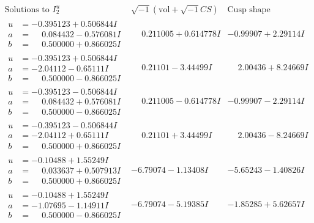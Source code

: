 \documentclass[1p]{elsarticle_modified}
\theoremstyle{definition}
\newcommand{\I}{\sqrt{-1}}
\begin{document}
$$\begin{array}{c|c|c}  
\text{Solutions to }I^u_{2}& \I (\text{vol} + \sqrt{-1}CS) & \text{Cusp shape}\\
 \hline 
\begin{aligned}
u &= -0.395123 + 0.506844 I \\
a &= \phantom{-}0.084432 - 0.576081 I \\
b &= \phantom{-}0.500000 + 0.866025 I\end{aligned}
 & \phantom{-}0.211005 + 0.614778 I & -0.99907 + 2.29114 I \\ \hline\begin{aligned}
u &= -0.395123 + 0.506844 I \\
a &= -2.04112 - 0.65111 I \\
b &= \phantom{-}0.500000 - 0.866025 I\end{aligned}
 & \phantom{-}0.21101 - 3.44499 I & \phantom{-}2.00436 + 8.24669 I \\ \hline\begin{aligned}
u &= -0.395123 - 0.506844 I \\
a &= \phantom{-}0.084432 + 0.576081 I \\
b &= \phantom{-}0.500000 - 0.866025 I\end{aligned}
 & \phantom{-}0.211005 - 0.614778 I & -0.99907 - 2.29114 I \\ \hline\begin{aligned}
u &= -0.395123 - 0.506844 I \\
a &= -2.04112 + 0.65111 I \\
b &= \phantom{-}0.500000 + 0.866025 I\end{aligned}
 & \phantom{-}0.21101 + 3.44499 I & \phantom{-}2.00436 - 8.24669 I \\ \hline\begin{aligned}
u &= -0.10488 + 1.55249 I \\
a &= \phantom{-}0.033637 + 0.507913 I \\
b &= \phantom{-}0.500000 + 0.866025 I\end{aligned}
 & -6.79074 - 1.13408 I & -5.65243 - 1.40826 I \\ \hline\begin{aligned}
u &= -0.10488 + 1.55249 I \\
a &= -1.07695 - 1.14911 I \\
b &= \phantom{-}0.500000 - 0.866025 I\end{aligned}
 & -6.79074 - 5.19385 I & -1.85285 + 5.62657 I \\ \hline\begin{aligned}

\end{aligned}
\end{array}$$
\end{document}

